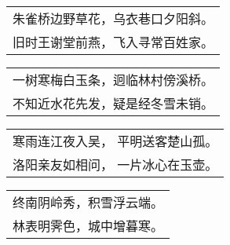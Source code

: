 \noindent\begin{minipage}{\linewidth}
  \vskip-3pt\begin{table}[H]
    \centering
    \begin{tabular}{@{}l@{}}
朱雀桥边野草花，乌衣巷口夕阳斜。\\
旧时王谢堂前燕，飞入寻常百姓家。
    \end{tabular}
  \end{table}
\end{minipage}
\vspace{1cm}


\noindent\begin{minipage}{\linewidth}
  \vskip-3pt\begin{table}[H]
    \centering
    \begin{tabular}{@{}l@{}}
一树寒梅白玉条，迥临林村傍溪桥。\\
不知近水花先发，疑是经冬雪未销。
    \end{tabular}
  \end{table}
\end{minipage}
\vspace{1cm}


\noindent\begin{minipage}{\linewidth}
  \vskip-3pt\begin{table}[H]
    \centering
    \begin{tabular}{@{}l@{}}
寒雨连江夜入吴， 平明送客楚山孤。\\
洛阳亲友如相问， 一片冰心在玉壶。
    \end{tabular}
  \end{table}
\end{minipage}
\vspace{1cm}


\noindent\begin{minipage}{\linewidth}
  \vskip-3pt\begin{table}[H]
    \centering
    \begin{tabular}{@{}l@{}}
终南阴岭秀，积雪浮云端。\\
林表明霁色，城中增暮寒。
    \end{tabular}
  \end{table}
\end{minipage}
\vspace{1cm}


